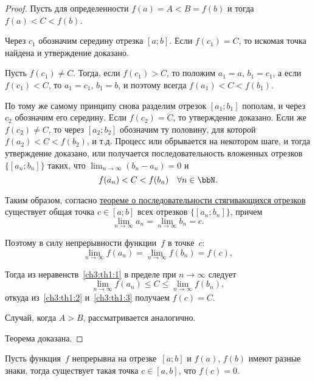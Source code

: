 \begin{proof}
Пусть для определенности $f(a)=A < B = f(b)$ и тогда $f(a) < C < f(b)$.

Через $c_1$ обозначим середину отрезка $[a;b]$. Если $f(c_1) = C$, то искомая точка найдена и утверждение доказано.

Пусть $f(c_1)\ne C$. Тогда, если $f(c_1) > C$, то положим $a_1 = a$, $b_1 = c_1$, а если $f(c_1) < C$, то $a_1 = c_1$, $b_1 = b$, и поэтому всегда $f(a_1)<C<f(b_1)$.

По тому же самому принципу снова разделим отрезок $[a_1; b_1]$ пополам, и через $c_2$ обозначим его середину. Если $f(c_2) = C$, то утверждение доказано. Если же $f(c_2) \ne C$, то через $[a_2;b_2]$ обозначим ту половину, для которой $f(a_2) < C < f(b_2)$, и т.д. Процесс или обрывается на некотором шаге, и тогда утверждение доказано, или получается последовательность вложенных отрезков $\{[a_n;b_n]\}$ таких, что $\lim_{n \to \infty}\limits(b_n-a_n)=0$ и
\begin{equation}\label{ch3:th1:1}
f(a_n)<C<f(b_n)\quad \forall n\in \bbN.
\end{equation}

Таким образом, согласно  \hyperref[ch1:th:poslstyag]{теореме о последовательности стягивающихся отрезков} существует общая точка $c \in [a;b]$ всех отрезков $\{[a_n;b_n]\}$, причем 
$$
\lim_{n \to \infty}a_n = \lim_{n \to \infty}b_n = c.
$$

Поэтому в силу непрерывности функции~$f$ в точке~$c$:
\begin{equation}\label{ch3:th1:2}
\lim_{n \to \infty}f(a_n) = \lim_{n \to \infty}f(b_n) = f(c),
\end{equation}

Тогда из неравенств~\eqref{ch3:th1:1} в пределе при $n \to \infty$ следует 
\begin{equation}\label{ch3:th1:3}
\lim_{n \to \infty}f(a_n) \le C \le \lim_{n \to \infty}f(b_n),
\end{equation}
откуда из~\eqref{ch3:th1:2} и~\eqref{ch3:th1:3} получаем $f(c)=C$.

Случай, когда $A > B$, рассматривается аналогично.
 
Теорема доказана.
\end{proof}

\begin{cons}
Пусть функция~$f$ непрерывна на отрезке~$[a;b]$ и $f(a)$, $f(b)$ имеют разные знаки, тогда существует такая точка $c \in [a,b]$, что $f(c)=0$.
\end{cons}

